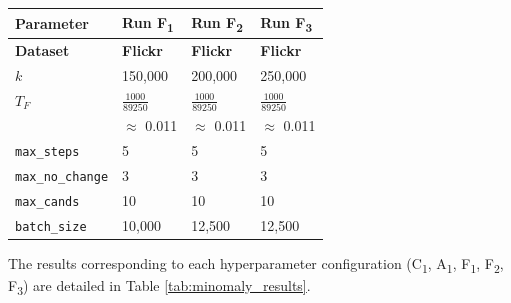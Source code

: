 \documentclass[pdflatex,sn-mathphys-num]{sn-jnl}%
\renewenvironment{table}[1][]%
{\tableorg[#1]%
\tablebodyfont%
\renewcommand\footnotetext[2][]{{\removelastskip\vskip0pt%
\let\tablebodyfont\tablefootnotefont%
\hskip0pt\if!##1!\else{\smash{$^{##1}$}}\fi##2\par}}%
}{\endtableorg}
\theoremstyle{thmstyleone}%
\theoremstyle{thmstyletwo}%
\theoremstyle{thmstylethree}%
\begin{document}
\begin{table}[H]
\centering
\caption{Minomaly Flickr Hyperparameters}
\scriptsize
\label{tab:flickr_minomaly_hyperparameters}
\begin{tabular}{|l|l|l|l|}
\hline
\textbf{Parameter} & \textbf{Run F\textsubscript{1}} & \textbf{Run F\textsubscript{2}} & \textbf{Run F\textsubscript{3}} \\ \hline
\textbf{Dataset}   & \textbf{Flickr}         & \textbf{Flickr}         & \textbf{Flickr}         \\ \hline
\boldmath$k$       & 150,000        & 200,000        & 250,000        \\ \hline
\boldmath$T_F$     & $\frac{1000}{89250}$ & $\frac{1000}{89250}$ & $\frac{1000}{89250}$ \\
                   & $\approx$ 0.011  & $\approx$ 0.011  & $\approx$ 0.011 \\ \hline
\texttt{max\_steps} & 5              & 5              & 5              \\ \hline
\texttt{max\_no\_change} & 3              & 3              & 3              \\ \hline
\texttt{max\_cands} & 10             & 10             & 10             \\ \hline
\texttt{batch\_size} & 10,000         & 12,500         & 12,500         \\ \hline
\end{tabular}
\end{table}

The results corresponding to each hyperparameter configuration (C\textsubscript{1}, A\textsubscript{1}, F\textsubscript{1}, F\textsubscript{2}, F\textsubscript{3}) are detailed in Table \ref{tab:minomaly_results}.
\end{document}
